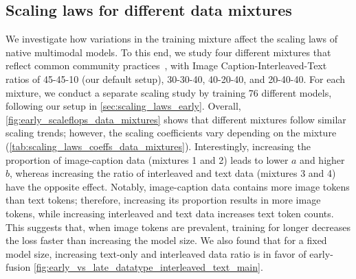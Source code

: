 \subsection{Scaling laws for different data mixtures}
\label{sec:scaling_data_mix}
We investigate how variations in the training mixture affect the scaling laws of
native multimodal models. To this end, we study four different mixtures that
reflect common community
practices~\citep{laurenccon2024obelics,mckinzie2025mm1,zhang2024mm1_5,lin2024vila},
with Image Caption-Interleaved-Text ratios of \colorbox{blue!10}{45-45-10} (our default setup),
\colorbox{red!10}{30-30-40}, \colorbox{green!10}{40-20-40}, and \colorbox{orange!10}{20-40-40}.  
For each mixture, we conduct a separate scaling study by training 76 different
models, following our setup in \cref{sec:scaling_laws_early}. Overall,
\cref{fig:early_scaleflops_data_mixtures} shows that different mixtures follow
similar scaling trends; however, the scaling coefficients vary depending on the
mixture (\cref{tab:scaling_laws_coeffs_data_mixtures}). Interestingly,
increasing the proportion of image-caption data (mixtures 1 and 2) leads to
lower $a$ and higher $b$, whereas increasing the ratio of interleaved and text
data (mixtures 3 and 4) have the opposite effect.  
Notably, image-caption data contains more image tokens than text
tokens; therefore, increasing its proportion results in more
image tokens, while increasing interleaved and text data increases text token
counts. This suggests that, when image tokens are prevalent, training for longer decreases the loss faster than increasing the model size. 
We also found that for a fixed model size, increasing text-only and interleaved data ratio is in favor of
early-fusion \cref{fig:early_vs_late_datatype_interleaved_text_main}.



























